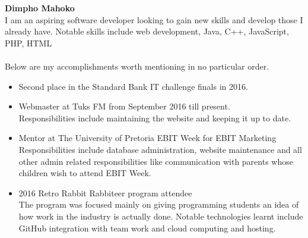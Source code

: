 \documentclass[12pt]{article}
\begin{document}
	
\textbf{Dimpho Mahoko} \\
	I am an aspiring software developer looking to gain new skills and develop those I already have. Notable skills include web development, Java, C++, JavaScript, PHP, HTML  \\ \\ %
	 Below are my accomplishments worth mentioning in no particular order.
	\begin{itemize}
		\item Second place in the Standard Bank IT challenge finals in 2016.\\
	
		\item Webmaster at Tuks FM from September 2016 till present. \\ 
			Responsibilities include maintaining the website and keeping it up to date. \\
			
		\item Mentor at The University of Pretoria EBIT Week for EBIT Marketing \\
			Responsibilities include database administration, website maintenance and all other admin related responsibilities like communication with parents whose children wish to attend EBIT Week. \\
			
		\item 2016 Retro Rabbit Rabbiteer program attendee \\
			The program was focused mainly on giving programming students an idea of how work in the industry is actually done. Notable technologies learnt include GitHub integration with team work and cloud computing and hosting. \\%
	\end{itemize}
	
\end{document}
